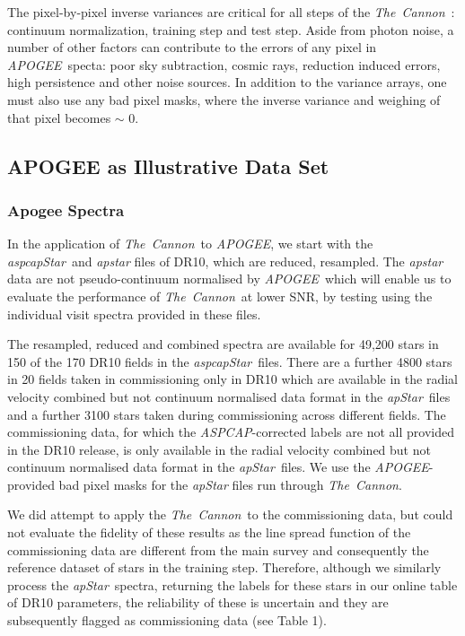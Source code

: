 \documentclass[12pt, preprint]{aastex}
\newcommand{\tc}{\textsl{The~Cannon}}
\newcommand{\apogee}{\textsl{APOGEE}}
\newcommand{\aspcap}{\textsl{ASPCAP}}
\newcommand{\aspcapstar}{\textsl{aspcapStar}}
\newcommand{\apstar}{\textsl{apStar}}
\begin{document}
The pixel-by-pixel inverse variances are critical for all steps of the \tc\ : continuum normalization, training step and test step.  
Aside from photon noise, a number of other factors can contribute to the errors of any pixel in \apogee\ specta: poor sky subtraction, cosmic rays, reduction induced errors, high persistence and other noise sources. In addition to the variance arrays, one must also use any bad pixel masks, where the 
inverse variance and weighing of that pixel becomes $\sim$ 0. 

\subsection{APOGEE as Illustrative Data Set}
\label{sec:Apogee_as_worked_Example}

\subsubsection{Apogee Spectra}\label{sec:ApogeeSpectra}

In the application of \tc\ to  \apogee, we start with the \aspcapstar\ and \textit{apstar} files of DR10,
which are reduced,  resampled. 
The \textit{apstar}  data are not pseudo-continuum normalised by \apogee\,
which will enable us to evaluate the performance of \tc\ at lower SNR, by testing using the individual visit spectra provided in these files. 

The resampled, reduced and combined spectra are available for 49,200 stars in 150 of the 170 DR10 fields in the \aspcapstar\ files. There are a further 4800 stars in 20 fields taken in commissioning only in DR10 which are available in the radial velocity combined but not continuum normalised data format in the \apstar\ files and a further 3100 stars taken during commissioning across different fields. 
The commissioning data, for which the \aspcap-corrected labels are not all provided in the DR10 release, is only available in the radial velocity combined but not continuum normalised data format in the \apstar\ files. 
We use the \apogee -provided bad pixel masks for the \textit{apStar} files run through \tc .

We did attempt to apply the \tc\ to the commissioning data, but could not evaluate the fidelity of these results as the line spread function of the commissioning data are different from the main survey and consequently the reference dataset of stars in the training step. 
Therefore, although we similarly process the \apstar\ spectra, returning the labels for these stars in our online table of DR10 parameters, the reliability of these is uncertain and they are subsequently flagged as commissioning data (see Table 1).
\end{document}
